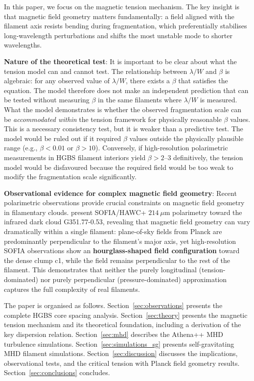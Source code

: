 \documentclass[11pt,a4paper]{article}
\begin{document}
In this paper, we focus on the magnetic tension mechanism. The key insight is that magnetic field geometry matters fundamentally: a field aligned with the filament axis resists bending during fragmentation, which preferentially stabilises long-wavelength perturbations and shifts the most unstable mode to shorter wavelengths.

\textbf{Nature of the theoretical test}: It is important to be clear about what the tension model can and cannot test. The relationship between $\lambda/W$ and $\beta$ is algebraic: for any observed value of $\lambda/W$, there exists a $\beta$ that satisfies the equation. The model therefore does not make an independent prediction that can be tested without measuring $\beta$ in the same filaments where $\lambda/W$ is measured. What the model demonstrates is whether the observed fragmentation scale can be \emph{accommodated within} the tension framework for physically reasonable $\beta$ values. This is a necessary consistency test, but it is weaker than a predictive test. The model would be ruled out if it required $\beta$ values outside the physically plausible range (e.g., $\beta < 0.01$ or $\beta > 10$). Conversely, if high-resolution polarimetric measurements in HGBS filament interiors yield $\beta > 2$--$3$ definitively, the tension model would be disfavoured because the required field would be too weak to modify the fragmentation scale significantly.

\textbf{Observational evidence for complex magnetic field geometry}: Recent polarimetric observations provide crucial constraints on magnetic field geometry in filamentary clouds. \citet{Jadhav2026} present SOFIA/HAWC+ $214~\mu$m polarimetry toward the infrared dark cloud G351.77-0.53, revealing that magnetic field geometry can vary dramatically within a single filament: plane-of-sky fields from Planck are predominantly perpendicular to the filament's major axis, yet high-resolution SOFIA observations show an \textbf{hourglass-shaped field configuration} toward the dense clump c1, while the field remains perpendicular to the rest of the filament. This demonstrates that neither the purely longitudinal (tension-dominated) nor purely perpendicular (pressure-dominated) approximation captures the full complexity of real filaments.

The paper is organised as follows. Section~\ref{sec:observations} presents the complete HGBS core spacing analysis. Section~\ref{sec:theory} presents the magnetic tension mechanism and its theoretical foundation, including a derivation of the key dispersion relation. Section~\ref{sec:mhd} describes the Athena++ MHD turbulence simulations. Section~\ref{sec:simulations_sg} presents self-gravitating MHD filament simulations. Section~\ref{sec:discussion} discusses the implications, observational tests, and the critical tension with Planck field geometry results. Section~\ref{sec:conclusions} concludes.
\end{document}
